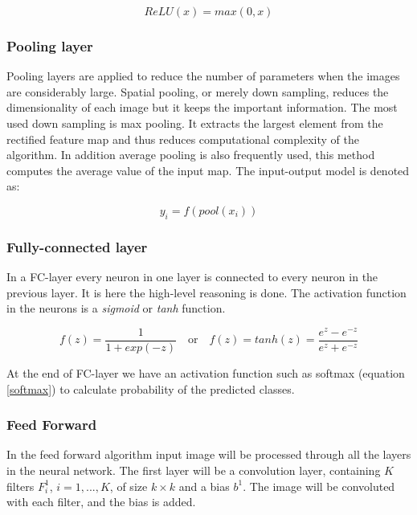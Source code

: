 \documentclass[english, a4paper]{article}
\begin{document}
\begin{equation} %
    ReLU(x) = max(0, x)
    \label{relu_func}
\end{equation}


\subsubsection{Pooling layer}
Pooling layers are applied to reduce the number of parameters when the images are considerably large. Spatial pooling, or merely down sampling, reduces the dimensionality of each image but it keeps the important information. The most used down sampling is max pooling. It extracts the largest element from the rectified feature map and thus reduces computational complexity of the algorithm. In addition average pooling is also frequently used, this method computes the average value of the input map. The input-output model is denoted as:

\begin{equation} %
  y_i = f(pool(x_i))
  \label{pool_func}
\end{equation}


\subsubsection{Fully-connected layer}
In a FC-layer every neuron in one layer is connected to every neuron in the previous layer. It is here the high-level reasoning is done. The activation function in the neurons is a \textit{sigmoid} or \textit{tanh} function.

\begin{equation} %
  f(z) = \frac{1}{1+exp(-z)} \quad \text{or} \quad f(z) = tanh(z) = \frac{e^{z} - e^{-z}}{e^{z} + e^{-z}}
\end{equation}

At the end of FC-layer we have an activation function such as softmax (equation \ref{softmax}) to calculate probability of the predicted classes.


\subsubsection{Feed Forward}
In the feed forward algorithm input image will be processed through all the layers in the neural network. The first layer will be a convolution layer, containing $K$ filters $F_i^1$, $i= 1, ..., K$, of size $k \times k$ and a bias $b^1$. The image will be convoluted with each filter, and the bias is added. 
\end{document}
